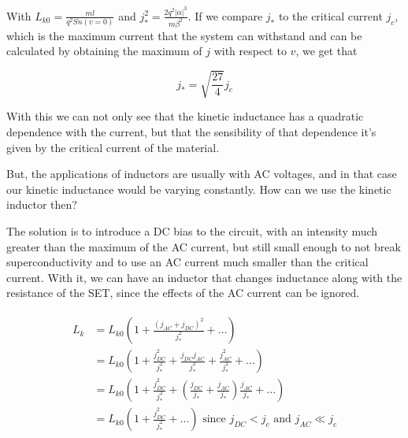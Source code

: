 \documentclass[../main.tex]{subfiles}
\begin{document}
With \(L_{k0} = \frac{ml}{q^2Sn(v=0)}\) and \(j_{*}^2 =
\frac{2q^2|\alpha|^3}{m\beta^2}\). If we compare \(j_{*}\)
to the critical current \(j_{c}\), which is the maximum current that
the system can withstand and can be calculated by obtaining the maximum of
\(j\) with respect to \(v\), we get that

\begin{equation*}
    j_{*} = \sqrt{\frac{27}{4}}j_{c}
\end{equation*}

With this we can not only see that the kinetic inductance has a quadratic
dependence with the current, but that the sensibility of that dependence it's
given by the critical current of the material.

But, the applications of inductors are usually with AC voltages, and in that
case our kinetic inductance would be varying constantly. How can we use the
kinetic inductor then?

The solution is to introduce a DC bias to the circuit, with an intensity much
greater than the maximum of the AC current, but still small enough to not break
superconductivity and to use an AC current much smaller than the critical current.
With it, we can have an inductor that changes inductance along with the resistance
of the SET, since the effects of the AC current can be ignored.

\begin{align*}
\begin{split}
L_{k} &= L_{k0}\left(1 + \frac{(j_{AC} + j_{DC})^2}{j_{*}^2} + \dots\right)\\
      &= L_{k0}\left(1 + \frac{j_{DC}^2}{j_{*}^2} + \frac{j_{DC}j_{AC}}{j_{*}^2} + 
      \frac{j_{AC}^2}{j_{*}^2} + \dots\right)\\
      &= L_{k0}\left(1 + \frac{j_{DC}^2}{j_{*}^2} + (\frac{j_{DC}}{j_{*}} + 
      \frac{j_{AC}}{j_{*}})\frac{j_{AC}}{j_{*}} + \dots\right)\\
      &= L_{k0}\left(1 + \frac{j_{DC}^2}{j_{*}^2} + \dots\right)
      \text{ since \(j_{DC} < j_{c}\) and \(j_{AC} \ll j_{c}\)}
\end{split}
\end{align*}
\end{document}
